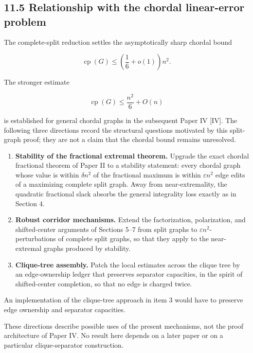\documentclass[english,11pt,a4paper]{article}
\begin{document}
\subsection{11.5 Relationship with the chordal linear-error
problem}\label{relationship-with-the-chordal-linear-error-problem}

The complete-split reduction settles the asymptotically sharp chordal
bound

\[
\operatorname{cp}(G)
\le
\left(\frac16+o(1)\right)n^2.
\]

The stronger estimate

\[
\operatorname{cp}(G)
\le
\frac{n^2}{6}+O(n)
\]

is established for general chordal graphs in the subsequent Paper IV
{[}IV{]}. The following three directions record the structural questions
motivated by this split-graph proof; they are not a claim that the
chordal bound remains unresolved.

\begin{enumerate}
\def\labelenumi{\arabic{enumi}.}
\item
  \textbf{Stability of the fractional extremal theorem.} Upgrade the
  exact chordal fractional theorem of Paper II to a stability statement:
  every chordal graph whose value is within \(\delta n^2\) of the
  fractional maximum is within \(\varepsilon n^2\) edge edits of a
  maximizing complete split graph. Away from near-extremality, the
  quadratic fractional slack absorbs the general integrality loss
  exactly as in Section 4.
\item
  \textbf{Robust corridor mechanisms.} Extend the factorization,
  polarization, and shifted-center arguments of Sections 5--7 from split
  graphs to \(\varepsilon n^2\)-perturbations of complete split graphs,
  so that they apply to the near-extremal graphs produced by stability.
\item
  \textbf{Clique-tree assembly.} Patch the local estimates across the
  clique tree by an edge-ownership ledger that preserves separator
  capacities, in the spirit of shifted-center completion, so that no
  edge is charged twice.
\end{enumerate}

An implementation of the clique-tree approach in item 3 would have to
preserve edge ownership and separator capacities.

These directions describe possible uses of the present mechanisms, not
the proof architecture of Paper IV. No result here depends on a later
paper or on a particular clique-separator construction.
\end{document}
